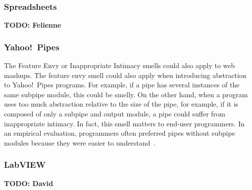 \documentclass[10pt,conference,compsocconf]{IEEEtran}
\newcommand{\todo}[1]{\textbf{TODO: #1}}
\begin{document}
\subsubsection{Spreadsheets} \todo{Felienne}
\subsubsection{Yahoo!\ Pipes}
The Feature Envy or Inappropriate Intimacy smells could also apply to web mashups. 
The feature envy smell could also apply when introducing abstraction to Yahoo!\ Pipes programs. For example, if a pipe has several instances of the same subpipe module, this could be smelly. 
On the other hand, when a program uses too much abstraction relative to the size of the pipe, for example, if it is composed of only a subpipe and output module, a pipe could suffer from inappropriate intimacy. In fact, this smell matters to end-user programmers.  In an empirical evaluation, programmers often preferred pipes without subpipe modules because they were easier to understand~\cite{StoleeTSE2013}. 



\subsubsection{LabVIEW} \todo{David}
\end{document}
